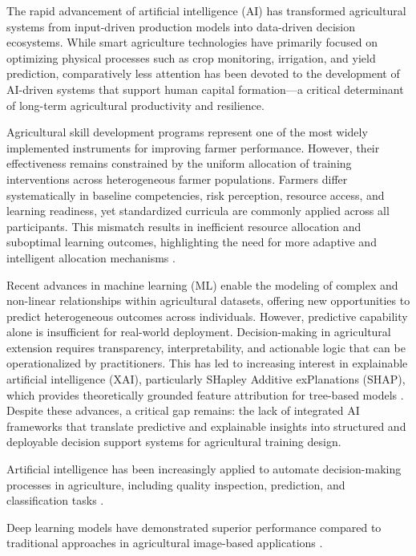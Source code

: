 The rapid advancement of artificial intelligence (AI) has transformed agricultural systems from input-driven production models into data-driven decision ecosystems. While smart agriculture technologies have primarily focused on optimizing physical processes such as crop monitoring, irrigation, and yield prediction, comparatively less attention has been devoted to the development of AI-driven systems that support human capital formation---a critical determinant of long-term agricultural productivity and resilience.

Agricultural skill development programs represent one of the most widely implemented instruments for improving farmer performance. However, their effectiveness remains constrained by the uniform allocation of training interventions across heterogeneous farmer populations. Farmers differ systematically in baseline competencies, risk perception, resource access, and learning readiness, yet standardized curricula are commonly applied across all participants. This mismatch results in inefficient resource allocation and suboptimal learning outcomes, highlighting the need for more adaptive and intelligent allocation mechanisms \cite{anderson2004,feder1985}.

Recent advances in machine learning (ML) \cite{kamilaris2018,liakos2018,yang2025} enable the modeling of complex and non-linear relationships within agricultural datasets, offering new opportunities to predict heterogeneous outcomes across individuals. However, predictive capability alone is insufficient for real-world deployment. Decision-making in agricultural extension requires transparency, interpretability, and actionable logic that can be operationalized by practitioners. This has led to increasing interest in explainable artificial intelligence (XAI)\cite{lundberg2017,arrieta2020,ryo2022}, particularly SHapley Additive exPlanations (SHAP), which provides theoretically grounded feature attribution for tree-based models \cite{lundberg2017}. Despite these advances, a critical gap remains: the lack of integrated AI frameworks that translate predictive and explainable insights into structured and deployable decision support systems for agricultural training design.

Artificial intelligence has been increasingly applied to automate decision-making processes in agriculture, including quality inspection, prediction, and classification tasks \cite{yang2025,wonggasem2024}.

Deep learning models have demonstrated superior performance compared to traditional approaches in agricultural image-based applications \cite{wonggasem2024}.

